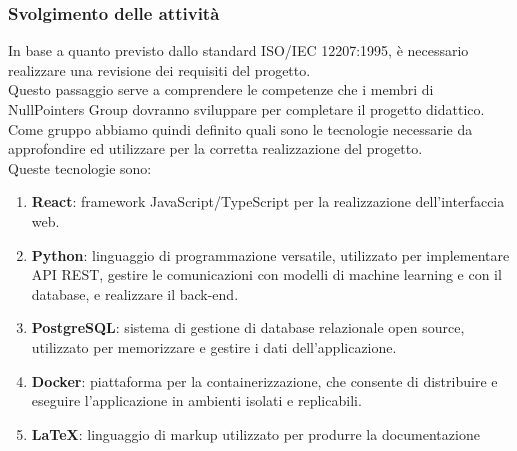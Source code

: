\subsubsection{Svolgimento delle attività}
In base a quanto previsto dallo standard ISO/IEC 12207:1995, è necessario realizzare una revisione dei requisiti del progetto.\\
Questo passaggio serve a comprendere le competenze che i membri di NullPointers Group dovranno sviluppare per completare il progetto didattico.\\
Come gruppo abbiamo quindi definito quali sono le tecnologie necessarie da approfondire ed utilizzare per la corretta realizzazione del progetto.\\
Queste tecnologie sono:
\begin{enumerate}
    \item \textbf{React}: framework JavaScript/TypeScript per la realizzazione dell'interfaccia web.
    \item \textbf{Python}: linguaggio di programmazione versatile, utilizzato per implementare API REST, gestire le comunicazioni con modelli di machine learning e con il database, e realizzare il back-end.
    \item \textbf{PostgreSQL}: sistema di gestione di database relazionale open source, utilizzato per memorizzare e gestire i dati dell’applicazione.
    \item \textbf{Docker}: piattaforma per la containerizzazione, che consente di distribuire e eseguire l’applicazione in ambienti isolati e replicabili.
    \item \textbf{LaTeX}: linguaggio di markup utilizzato per produrre la documentazione
\end{enumerate}